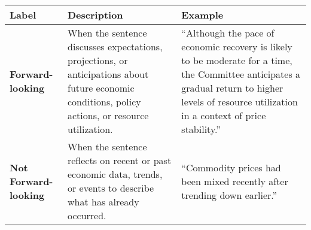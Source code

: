 \begin{table*}
    \caption{}
    \vspace{1em}
    \begin{tabular}{p{}p{}p{}}
    \toprule
    \textbf{Label} & \textbf{Description} & \textbf{Example}\\
    \midrule
    \textbf{Forward-looking} & When the sentence discusses expectations, projections, or anticipations about future economic conditions, policy actions, or resource utilization. & “Although the pace of economic recovery is likely to be moderate for a time, the Committee anticipates a gradual return to higher levels of resource utilization in a context of price stability.” \\
    \midrule
    \textbf{Not Forward-looking} & When the sentence reflects on recent or past economic data, trends, or events to describe what has already occurred. & “Commodity prices had been mixed recently after trending down earlier.” \\
    \bottomrule
    \end{tabular}
    \label{tb:snb_forward_looking_guide}
    \end{table*}